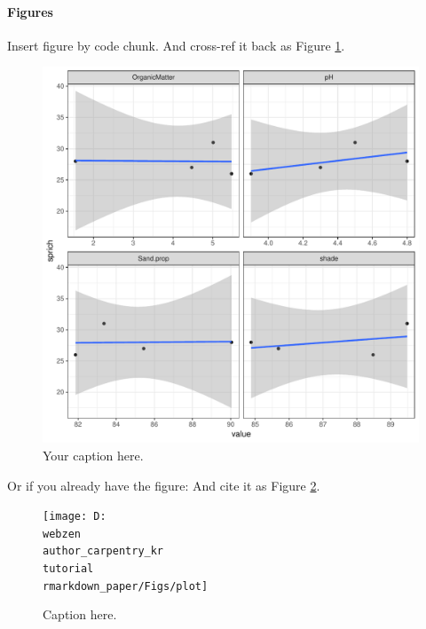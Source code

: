 \documentclass[12pt,]{article}
\let\oldparagraph\paragraph
\renewcommand{\paragraph}[1]{\oldparagraph{#1}\mbox{}}
\begin{document}
\hypertarget{figures}{%
\paragraph{Figures}\label{figures}}

Insert figure by code chunk. And cross-ref it back as Figure
\ref{fig:figName}.

\begin{figure}

{\centering \includegraphics{ms_files/figure-latex/figName-1} 

}

\caption{Your caption here.}\label{fig:figName}
\end{figure}

Or if you already have the figure: And cite it as Figure \ref{fig:fig2}.

\begin{figure}

{\centering \texttt{[image: D:\\webzen\\author\_carpentry\_kr\\tutorial\\rmarkdown\_paper/Figs/plot]} 

}

\caption{Caption here.}\label{fig:fig2}
\end{figure}
\end{document}

